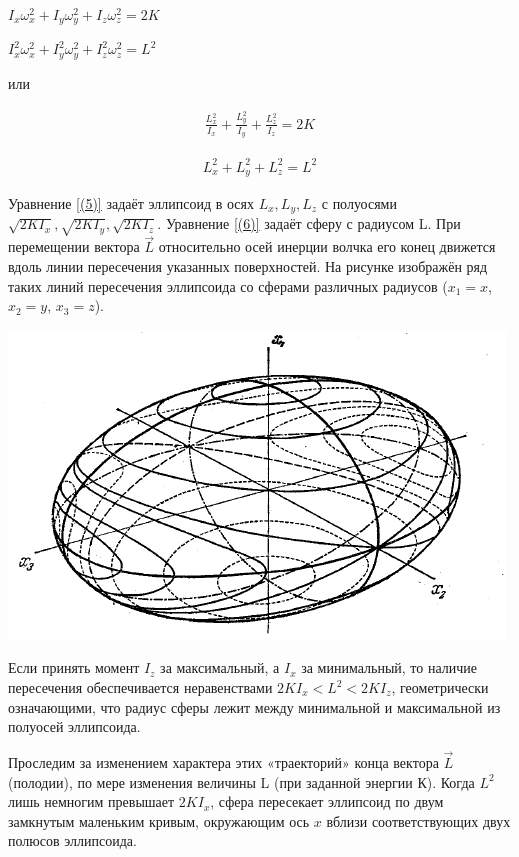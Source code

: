 \documentclass{article}
\begin{document}
\begin{center}
$I_x\omega_x^2 + I_y\omega_y^2 + I_z\omega_z^2 = 2K$
\end{center}
\begin{center}
$I_x^2\omega_x^2 + I_y^2\omega_y^2 + I_z^2\omega_z^2 = L^2$
\end{center}

или

\begin{equation} 
\begin{gathered}
\label{(5)}
\frac{L_x^2}{I_x} + \frac{L_y^2}{I_y} + \frac{L_z^2}{I_z} = 2K
\end{gathered}
\end{equation}

\begin{equation} 
\begin{gathered}
\label{(6)}
L_x^2 + L_y^2 + L_z^2 = L^2
\end{gathered}
\end{equation}

Уравнение \ref{(5)} задаёт эллипсоид в осях $L_x, L_y, L_z$ с полуосями $\sqrt{2KI_x}, \sqrt{2KI_y}, \sqrt{2KI_z}$. Уравнение \ref{(6)} задаёт сферу с радиусом L. При перемещении вектора $\vec{L}$ относительно осей инерции волчка его конец движется вдоль линии пересечения указанных поверхностей. На рисунке изображён ряд таких линий пересечения эллипсоида со сферами различных радиусов ($x_1 = x$, $x_2 = y$, $x_3 = z$).

\begin{center}
\includegraphics[width=0.4\linewidth]{1.png}
\end{center}

Если принять момент $I_z$ за максимальный, а $I_x$ за минимальный, то наличие пересечения обеспечивается неравенствами $2KI_x <  L^2 < 2KI_z$, геометрически означающими, что радиус сферы лежит между минимальной и максимальной из полуосей эллипсоида. 

Проследим за изменением характера этих «траекторий» конца вектора $\vec{L}$ (полодии), по мере изменения величины L (при заданной энергии К). Когда $L^2$ лишь немногим превышает $2KI_x$, сфера пересекает эллипсоид по двум замкнутым маленьким кривым, окружающим ось $x$ вблизи соответствующих двух полюсов эллипсоида.
\end{document}
